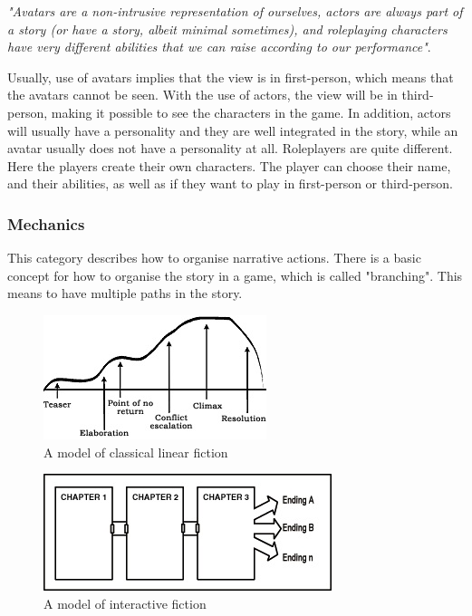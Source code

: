 \emph{"Avatars are a non-intrusive representation of ourselves, actors are always part of a story (or have a story, albeit minimal sometimes), and roleplaying characters have very different abilities that we can raise according to our performance"}. \cite{understandingvg}

Usually, use of avatars implies that the view is in first-person, which means that the avatars cannot be seen. With the use of actors, the view will be in third-person, making it possible to see the characters in the game. In addition, actors will usually have a personality and they are well integrated in the story, while an avatar usually does not have a personality at all. Roleplayers are quite different. Here the players create their own characters. The player can choose their name, and their abilities, as well as if they want to play in first-person or third-person.  

\subsubsection{Mechanics}
This category describes how to organise narrative actions. There is a basic concept for how to organise the story in a game, which is called "branching". This means to have multiple paths in the story. 

\begin{figure}
\begin{center}
\includegraphics[scale=1.0]{linearFiction}
\caption[Classical linear fiction]{A model of classical linear fiction \cite{understandingvg}}
\label{fig:linearfiction}
\end{center}
\end{figure} 
\begin{figure}
\begin{center}
\includegraphics[scale=1.0]{interactiveFiction}
\caption[Interactive fiction]{A model of interactive fiction \cite{understandingvg}}
\label{fig:interactivefiction}
\end{center}
\end{figure} 

